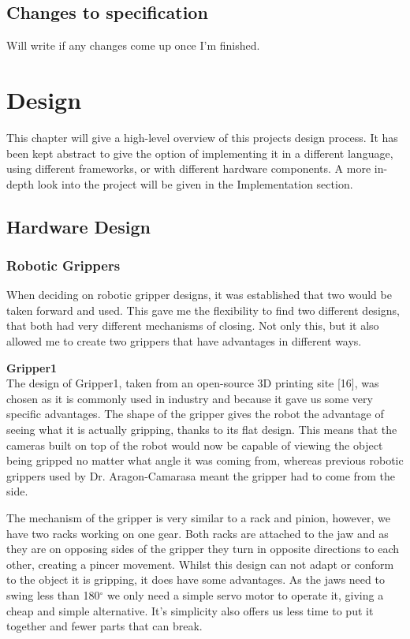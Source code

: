 \documentclass{l4proj}
\begin{document}
\section{Changes to specification}
Will write if any changes come up once I'm finished. 

\chapter{Design}
This chapter will give a high-level overview of this projects design process. It has been kept abstract to give the option of implementing it in a different language, using different frameworks, or with different hardware components. A more in-depth look into the project will be given in the Implementation section. 

\section{Hardware Design}

\subsection{Robotic Grippers}
When deciding on robotic gripper designs, it was established that two would be taken forward and used. This gave me the flexibility to find two different designs, that both had very different mechanisms of closing. Not only this, but it also allowed me to create two grippers that have advantages in different ways. 

\textbf{Gripper1}\\
The design of Gripper1, taken from an open-source 3D printing site [16], was chosen as it is commonly used in industry and because it gave us some very specific advantages. The shape of the gripper gives the robot the advantage of seeing what it is actually gripping, thanks to its flat design. This means that the cameras built on top of the robot would now be capable of viewing the object being gripped no matter what angle it was coming from, whereas previous robotic grippers used by Dr. Aragon-Camarasa meant the gripper had to come from the side.

The mechanism of the gripper is very similar to a rack and pinion, however, we have two racks working on one gear. Both racks are attached to the jaw and as they are on opposing sides of the gripper they turn in opposite directions to each other, creating a pincer movement. Whilst this design can not adapt or conform to the object it is gripping, it does have some advantages. As the jaws need to swing less than 180$^{\circ}$ we only need a simple servo motor to operate it, giving a cheap and simple alternative. It's simplicity also offers us less time to put it together and fewer parts that can break.
\end{document}

